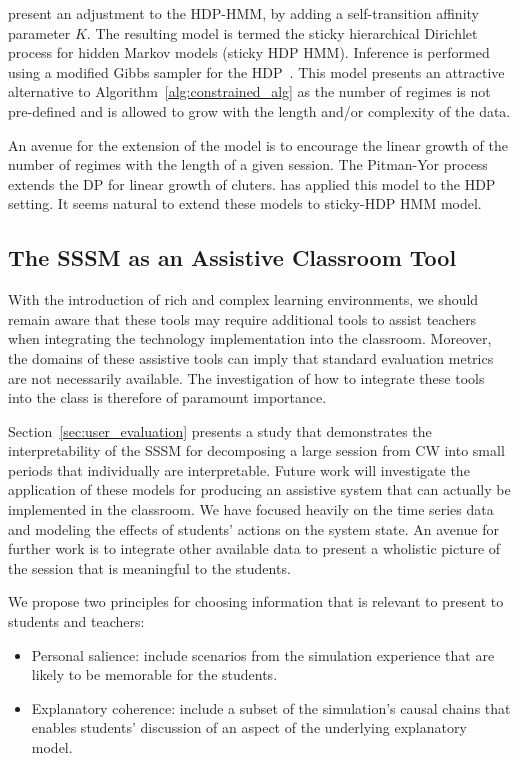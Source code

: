 
\cite{fox2009nonparametric, fox2007hierarchical} present an adjustment to the HDP-HMM, by adding a self-transition affinity parameter $K$. The resulting model is termed the sticky hierarchical Dirichlet process for hidden Markov models (sticky HDP HMM). Inference is performed using a modified Gibbs sampler for the HDP~\cite{teh2005sharing}. This model presents an attractive alternative to Algorithm~\ref{alg:constrained_alg} as the number of regimes is not pre-defined and is allowed to grow with the length and/or complexity of the data.

An avenue for the extension of the \citep{fox2009nonparametric} model is to encourage the linear growth of the number of regimes with the length of a given session. The Pitman-Yor process~\citep{pitman1997two} extends the DP for linear growth of cluters. \cite{teh2006hierarchical} has applied this model to the HDP setting. It seems natural to extend these models to \cite{fox2009nonparametric} sticky-HDP HMM model.

\subsection{The SSSM as an Assistive Classroom Tool}\label{sec:class-assistive}
With the introduction of rich and complex learning environments, we should remain aware that these tools may require additional tools to assist teachers when integrating the technology implementation into the classroom. Moreover, the domains of these assistive tools can imply that standard evaluation metrics are not necessarily available. The investigation of how to integrate these tools into the class is therefore of paramount importance.

Section~\ref{sec:user_evaluation} presents a study that demonstrates the interpretability of the SSSM for decomposing a large session from CW into small periods that individually are interpretable. Future work will investigate the application of these models for producing an assistive system that can actually be implemented in the classroom. We have focused heavily on the time series data and modeling the effects of students' actions on the system state. An avenue for further work is to integrate other available data to present a wholistic picture of the session that is meaningful to the students.

We propose two principles for choosing information that is relevant to present to students and teachers:
\begin{itemize}
  \item Personal salience: include scenarios from the simulation experience that are likely to be memorable for the students.
  \item Explanatory coherence: include a subset of the simulation’s causal chains that enables students’ discussion of an aspect of the underlying explanatory model.
\end{itemize}

